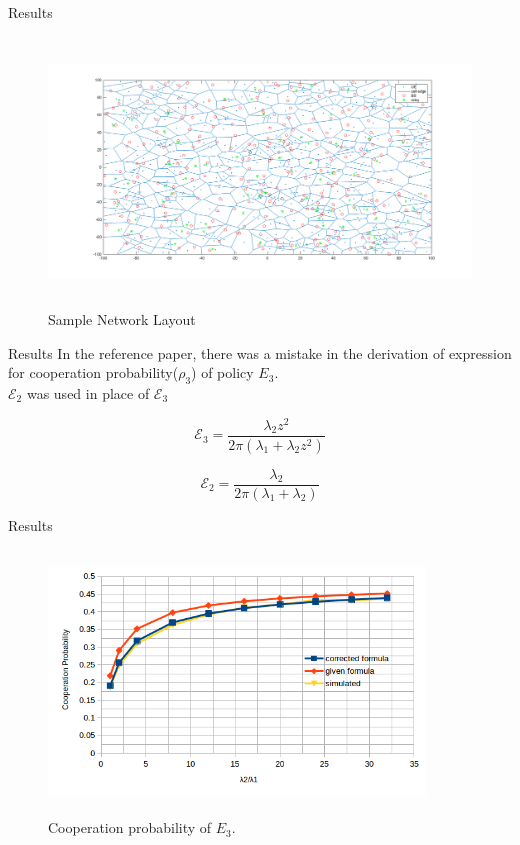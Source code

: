 \documentclass{beamer}
\begin{document}
\begin{frame}{Results}
\begin{figure}[!h]
\includegraphics[height = 2.8in,width=4.5in,angle=00]{figures/netLayoutSim.png}
\centering
\vspace{-2mm}
\caption{Sample Network Layout}
\label{plot4}
\end{figure}
\end{frame}

\begin{frame}{Results}
In the reference paper, there was a mistake in the derivation of expression for cooperation probability($\rho_3$) of policy $E_3$. \\
$\mathcal{E}_2$ was used in place of $\mathcal{E}_3$

\begin{equation*}
\mathcal{E}_3 = \frac{\lambda_2 z^2}{2\pi(\lambda_1+\lambda_2z^2)}
\end{equation*}

\begin{equation*}
\mathcal{E}_2 = \frac{\lambda_2}{2\pi(\lambda_1+\lambda_2)}
\end{equation*}
\end{frame}

\begin{frame}{Results}
\begin{figure}[!h]
\includegraphics[width=10cm, height= 7cm]{figures/corrected.png}
\centering
\vspace{-2mm}
\caption{Cooperation probability of $E_3$.}
\label{plot1}
\end{figure}
\end{frame}
\end{document}
